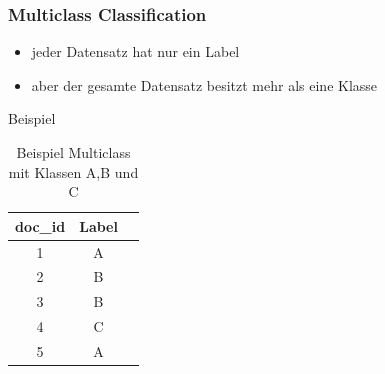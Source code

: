 \documentclass[12pt, xcolor=table]{beamer}
\begin{document}
\begin{frame}
    \frametitle{Multiclass Classification}
    \begin{itemize}
        \item jeder Datensatz hat nur ein Label
        \item aber der gesamte Datensatz besitzt mehr als eine Klasse
    \end{itemize}
    \begin{block}{Beispiel}
    \begin{center}
    \begin{table}
        \begin{tabular}{ccc}
            \tiny\textbf{doc\_id} &\tiny \textbf{Label}  \\
            \hline
            \tiny 1 &\tiny A  \\
            \tiny 2 &\tiny B  \\
            \tiny 3 &\tiny B  \\
            \tiny 4 &\tiny C  \\
            \tiny 5 &\tiny A  \\
        \end{tabular}
         \caption*{Beispiel Multiclass mit Klassen A,B und C}
    \end{table}
    \end{center}
    \end{block}
\end{frame}
\end{document}
